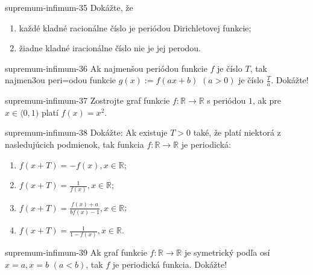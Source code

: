 \begin{defproblem}{supremum-infimum-35}
Dokážte, že
\begin{enumerate}
\item každé kladné racionálne číslo je periódou Dirichletovej funkcie;
\item žiadne kladné iracionálne číslo nie je jej perodou.
\end{enumerate}
\end{defproblem}

\begin{defproblem}{supremum-infimum-36}
Ak najmenšou periódou funkcie $f$ je číslo $T$, tak najmen3ou peri=odou funkcie $g(x):=f(ax+b)$ $(a>0)$ je číslo $\frac{T}{a}$. Dokážte!
\end{defproblem}

\begin{defproblem}{supremum-infimum-37}
Zostrojte graf funkcie $f:\mathbb{R}\rightarrow\mathbb{R}$ s periódou $1$, ak pre $x\in\langle 0,1)$ platí $f(x)=x^2$.
\end{defproblem}

\begin{defproblem}{supremum-infimum-38}
Dokážte: Ak existuje $T>0$ také, že platí niektorá z nasledujúcich podmienok, tak funkcia $f:\mathbb{R}\rightarrow\mathbb{R}$ je periodická:
\begin{multicols}{2}
\begin{enumerate}
    \item $f(x+T)=-f(x),x\in\mathbb{R}$;
    \item $f(x+T)=\frac{1}{f(x)},x\in\mathbb{R}$;
    \item $f(x+T)=\frac{f(x)+a}{bf(x)-1},x\in\mathbb{R}$;
    \item $f(x+T)=\frac{1}{1-f(x)},x\in\mathbb{R}$.
\end{enumerate}
\end{multicols}
\end{defproblem}

\begin{defproblem}{supremum-infimum-39}
Ak graf funkcie $f:\mathbb{R}\rightarrow\mathbb{R}$ je symetrický podľa osí $x=a,x=b$ $(a<b)$, tak $f$ je periodická funkcia. Dokážte!
\end{defproblem}

